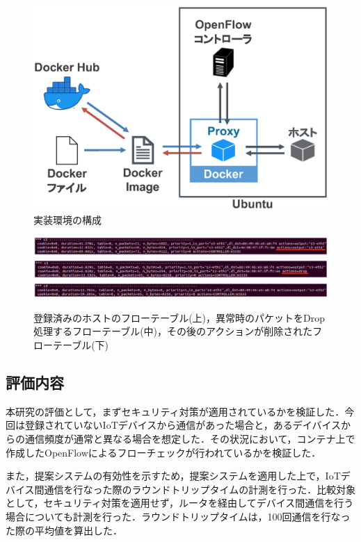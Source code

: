 \documentclass[Japanese]{dicomopapers}
\begin{document}
\begin{figure}[!tb]
	\centering
	\includegraphics[width=\linewidth]{img/program.eps}
	\caption{実装環境の構成}
	\label{fig:program}
\end{figure}

\begin{figure}[!tb]
	\centering
	\includegraphics[width=\linewidth]{img/result_flow4v3.eps}
	\includegraphics[width=\linewidth]{img/result_flow2v3.eps}
	\includegraphics[width=\linewidth]{img/result_flow3v2.eps}
	\caption{登録済みのホストのフローテーブル(上)，異常時のパケットをDrop処理するフローテーブル(中)，その後のアクションが削除されたフローテーブル(下)}
	\label{fig:result1}
\end{figure}

\subsection{評価内容}
本研究の評価として，まずセキュリティ対策が適用されているかを検証した．今回は登録されていないIoTデバイスから通信があった場合と，あるデイバイスからの通信頻度が通常と異なる場合を想定した．その状況において，コンテナ上で作成したOpenFlowによるフローチェックが行われているかを検証した．\par
また，提案システムの有効性を示すため，提案システムを適用した上で，IoTデバイス間通信を行なった際のラウンドトリップタイムの計測を行った．比較対象として，セキュリティ対策を適用せず，ルータを経由してデバイス間通信を行う場合についても計測を行った．ラウンドトリップタイムは，100回通信を行なった際の平均値を算出した．
\end{document}
